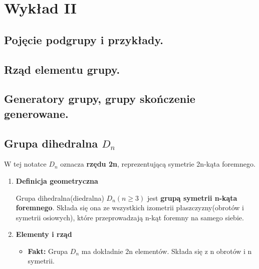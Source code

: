 \chapter{Wykład II}
\section{Pojęcie podgrupy i przykłady. }
\section{Rząd elementu grupy.}
\section{Generatory grupy, grupy skończenie generowane.}
\section{Grupa dihedralna $D_{n}$}

\begin{context}[Notacja]
	W tej notatce $D_{n}$ oznacza \textbf{rzędu 2n}, reprezentującą symetrie 2n-kąta foremnego.
\end{context}
\begin{enumerate}[label=\arabic*.]
	\item \textbf{Definicja geometryczna} 
		
		Grupa dihedralna(diedralna) $D_{n}\left( n\ge 3 \right)$ jest \textbf{grupą symetrii n-kąta foremnego}. Składa się ona ze wszystkich izometrii płaszczyzny(obrotów i symetrii osiowych), które przeprowadzają n-kąt foremny na samego siebie.
	\item \textbf{Elementy i rząd}

		\begin{itemize}
			\item \textbf{Fakt:} Grupa $D_{n}$ ma dokładnie 2n elementów. Składa się z n obrotów i n symetrii.  
		\end{itemize}
\end{enumerate}

